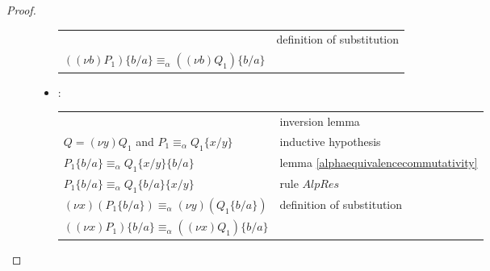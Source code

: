 \begin{proof}
\begin{description}
\begin{itemize}
\begin{center}
\begin{tabular}{ll}
		  &
		    definition of substitution
		\\
		    $((\nu b)P_{1})\{b/a\}\equiv_{\alpha} ((\nu b)Q_{1})\{b/a\}$
		  &
		\\
	      \end{tabular}
	    \end{center}	
	  \item:
	    \begin{center}
	      \begin{tabular}{ll}
		  &
		    inversion lemma 
		\\
		    $Q=(\nu y) Q_{1}$ and $P_{1}\equiv_{\alpha}Q_{1}\{x/y\}$ 
		  &
		    inductive hypothesis
		\\
		    $P_{1}\{b/a\}\equiv_{\alpha} Q_{1}\{x/y\}\{b/a\}$
		  &
		    lemma \ref{alphaequivalencecommutativity}
		\\
		    $P_{1}\{b/a\}\equiv_{\alpha} Q_{1}\{b/a\}\{x/y\}$
		  &
		    rule $AlpRes$
		\\
		    $(\nu x)(P_{1}\{b/a\})\equiv_{\alpha} (\nu y)(Q_{1}\{b/a\})$
		  &
		    definition of substitution
		\\
		    $((\nu x)P_{1})\{b/a\}\equiv_{\alpha} ((\nu x)Q_{1})\{b/a\}$
		  &
		\\
	      \end{tabular}
	    \end{center}	
	\end{itemize}
    \end{description}
  \end{proof}





















